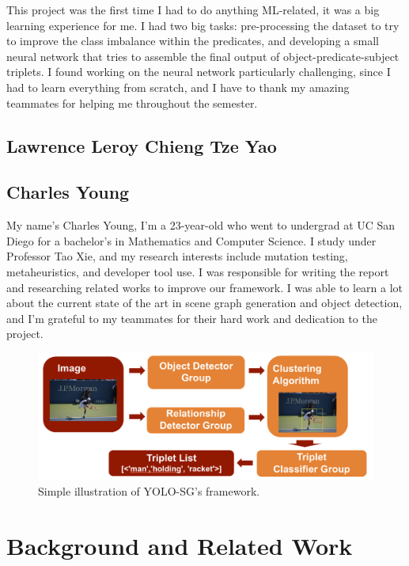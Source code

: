 \documentclass{article}
\begin{document}
This project was the first time I had to do anything ML-related, it was a big learning experience for me. I had two big tasks: pre-processing the dataset to try to improve the class imbalance within the predicates, and developing a small neural network that tries to assemble the final output of object-predicate-subject triplets. I found working on the neural network particularly challenging, since I had to learn everything from scratch, and I have to thank my amazing teammates for helping me throughout the semester.
\subsection*{Lawrence Leroy Chieng Tze Yao}
\subsection*{Charles Young}
My name's Charles Young, I'm a 23-year-old who went to undergrad at UC San Diego for a bachelor's in Mathematics and Computer Science. I study under Professor Tao Xie, and my research interests include mutation testing, metaheuristics, and developer tool use. I was responsible for writing the report and researching related works to improve our framework. I was able to learn a lot about the current state of the art in scene graph generation and object detection, and I'm grateful to my teammates for their hard work and dedication to the project.

\begin{figure}
    \includegraphics[width=\textwidth]{figures/figure4.png}
  \centering
  \caption{Simple illustration of YOLO-SG's framework.}
\end{figure}
\section{Background and Related Work}
\end{document}
